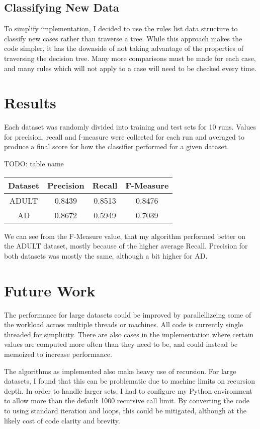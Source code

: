 \documentclass[letterpaper]{article}
\begin{document}
\subsection{Classifying New Data}
To simplify implementation, I decided to use the rules list data structure to 
classify new cases rather than traverse a tree. While this approach makes the 
code simpler, it has the downside of not taking advantage of the properties 
of traversing the decision tree. Many more comparisons must be made for each 
case, and many rules which will not apply to a case will need to be 
checked every time.

\section{Results}
Each dataset was randomly divided into training and test sets for 10 runs. 
Values for precision, recall and f-measure were collected for each run and 
averaged to produce a final score for how the classifier 
performed for a given dataset.

TODO: table name
\begin{center}
 \begin{tabular}{||c c c c||} 
 \hline
 Dataset & Precision & Recall & F-Measure \\ [0.5ex] 
 \hline\hline
 ADULT & 0.8439 & 0.8513 &  0.8476 \\ 
 \hline
 AD & 0.8672 & 0.5949 &  0.7039 \\
 \hline
\end{tabular}
\end{center}

We can see from the F-Measure value, that my algorithm performed better on the
ADULT dataset, mostly because of the higher average Recall. Precision for both
datasets was mostly the same, although a bit higher for AD.


\section{Future Work}
The performance for large datasets could be improved by parallellizeing some of 
the workload across multiple threads or machines. All code is currently single 
threaded for simplicity. There are also cases in the implementation where 
certain values are computed more often than they need to be, and could instead 
be memoized to increase performance.

The algorithms as implemented also make heavy use of recursion. For 
large datasets, I found that this can be problematic due to machine limits on 
recursion depth. In order to handle larger sets, I had to configure my Python 
environment to allow more than the default 1000 recursive call limit. 
By converting the code to using standard iteration and loops, this could 
be mitigated, although at the likely cost of code clarity and brevity.
\end{document}
